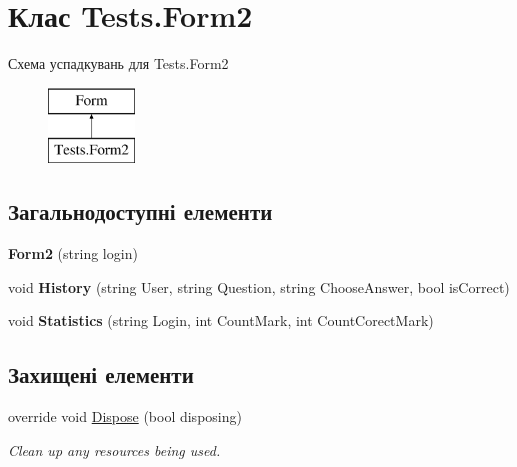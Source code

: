 \hypertarget{class_tests_1_1_form2}{}\section{Клас Tests.\+Form2}
\label{class_tests_1_1_form2}
Схема успадкувань для Tests.\+Form2\begin{figure}[H]
\begin{center}
\leavevmode
\includegraphics[height=2.000000cm]{class_tests_1_1_form2}
\end{center}
\end{figure}
\subsection*{Загальнодоступні елементи}
\begin{DoxyCompactItemize}
\item 
{\bfseries Form2} (string login)\hypertarget{class_tests_1_1_form2_a7e39b93c958b8e506e2d4da276f89e4d}{}\label{class_tests_1_1_form2_a7e39b93c958b8e506e2d4da276f89e4d}

\item 
void {\bfseries History} (string User, string Question, string Choose\+Answer, bool is\+Correct)\hypertarget{class_tests_1_1_form2_af571b5761eaae8749d8c0fa64394dbc0}{}\label{class_tests_1_1_form2_af571b5761eaae8749d8c0fa64394dbc0}

\item 
void {\bfseries Statistics} (string Login, int Count\+Mark, int Count\+Corect\+Mark)\hypertarget{class_tests_1_1_form2_af44e8c4f06da0c032f679825743fba6a}{}\label{class_tests_1_1_form2_af44e8c4f06da0c032f679825743fba6a}

\end{DoxyCompactItemize}
\subsection*{Захищені елементи}
\begin{DoxyCompactItemize}
\item 
override void \hyperlink{class_tests_1_1_form2_a8213f04aa4b31d28ee9f1a0f8842fb29}{Dispose} (bool disposing)
\begin{DoxyCompactList}\small\item\em Clean up any resources being used. \end{DoxyCompactList}\end{DoxyCompactItemize}
